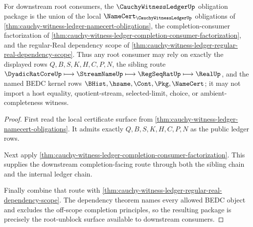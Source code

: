 \begin{theorem}
\label{thm:cauchy-witness-ledger-root-unblock-obligation-package}
For downstream root consumers, the $\CauchyWitnessLedgerUp$ obligation package is the union of the local $\NameCert_{\CauchyWitnessLedgerUp}$ obligations of \autoref{thm:cauchy-witness-ledger-namecert-obligations}, the completion-consumer factorization of \autoref{thm:cauchy-witness-ledger-completion-consumer-factorization}, and the regular-Real dependency scope of \autoref{thm:cauchy-witness-ledger-regular-real-dependency-scope}. Thus any root consumer may rely on exactly the displayed rows $Q,B,S,K,H,C,P,N$, the sibling route $\DyadicRatCoreUp \longmapsto \StreamNameUp \longmapsto \RegSeqRatUp \longmapsto \RealUp$, and the named BEDC kernel rows $\BHist,\hsame,\Cont,\Pkg,\NameCert$; it may not import a host equality, quotient-stream, selected-limit, choice, or ambient-completeness witness.
\end{theorem}
\begin{proof}
First read the local certificate surface from \autoref{thm:cauchy-witness-ledger-namecert-obligations}. It admits exactly $Q,B,S,K,H,C,P,N$ as the public ledger rows.

Next apply \autoref{thm:cauchy-witness-ledger-completion-consumer-factorization}. This supplies the downstream completion-facing route through both the sibling chain and the internal ledger chain.

Finally combine that route with \autoref{thm:cauchy-witness-ledger-regular-real-dependency-scope}. The dependency theorem names every allowed BEDC object and excludes the off-scope completion principles, so the resulting package is precisely the root-unblock surface available to downstream consumers.
\end{proof}

